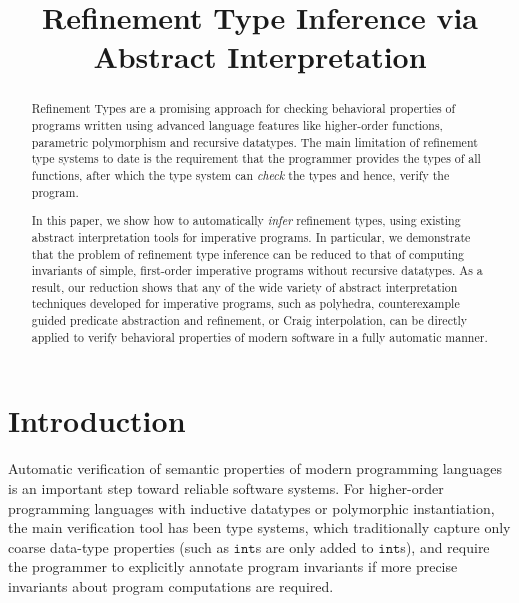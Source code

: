 \documentclass[nocopyrightspace]{sigplanconf}
\def\ttint{\mathtt{int}}
\begin{document}
\title{Refinement Type Inference via Abstract Interpretation}

\maketitle

\begin{abstract}
Refinement Types are a promising approach for checking behavioral
properties of programs written using advanced language features like
higher-order functions, parametric polymorphism and recursive datatypes.
The main limitation of refinement type systems to date is the  
requirement that the programmer provides the types of all functions, 
after which the type system can {\em check} the types and hence, verify the program.

In this paper, we show how to automatically {\em infer} refinement types, using
existing abstract interpretation tools for imperative programs. 
In particular, we demonstrate that the problem of refinement type 
inference can be reduced to that of computing invariants of simple, 
first-order imperative programs without recursive datatypes.
As a result, our reduction shows that any of the wide variety of 
abstract interpretation techniques developed for imperative programs, 
such as polyhedra, counterexample guided predicate abstraction 
and refinement, or Craig interpolation,
can be directly applied to verify behavioral properties of 
modern software in a fully automatic manner.
\end{abstract}


\section{Introduction}
\label{sec:intro}

Automatic verification of semantic properties of modern programming languages
is an important step toward reliable software systems.
For higher-order programming languages with inductive datatypes
or polymorphic instantiation, the main verification tool has been type systems,
which traditionally capture only coarse data-type properties (such as $\ttint$s are
only added to $\ttint$s),
and require the programmer to explicitly annotate program invariants if
more precise invariants about program computations are required. 
\end{document}

